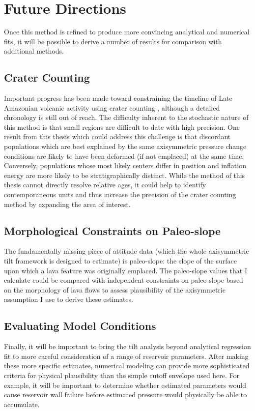 \section{Future Directions}

Once this method is refined to produce more convincing analytical and numerical fits, it will be possible to derive a number of results for comparison with additional methods.

\subsection{Crater Counting}
Important progress has been made toward constraining the timeline of Late Amazonian volcanic activity using crater counting \parencite{kneissl_map-projection-independent_2011,robbins_volcanic_2011,
robbins_large_2013,
platz_crater-based_2013}, although a detailed chronology is still out of reach. The difficulty inherent to the stochastic nature of this method is that small regions are difficult to date with high precision. One result from this thesis which could address this challenge is that discordant populations which are best explained by the same axisymmetric pressure change conditions are likely to have been deformed (if not emplaced) at the same time. Conversely, populations whose most likely centers differ in position and inflation energy are more likely to be stratigraphically distinct. While the method of this thesis cannot directly resolve relative ages, it could help to identify contemporaneous units and thus increase the precision of the crater counting method by expanding the area of interest.

\subsection{Morphological Constraints on Paleo-slope}

The fundamentally missing piece of attitude data (which the whole axisymmetric tilt framework is designed to estimate) is paleo-slope: the slope of the surface upon which a lava feature was originally emplaced. The paleo-slope values that I calculate could be compared with independent constraints on paleo-slope based on the morphology of lava flows \parencite{wadge_lobes_1991, peitersen_correlations_2000, peters_lava_2021} to assess plausibility of the axisymmetric assumption I use to derive these estimates.

\subsection{Evaluating Model Conditions}

Finally, it will be important to bring the tilt analysis beyond analytical regression fit to more careful consideration of a range of reservoir parameters. After making these more specific estimates, numerical modeling can provide more sophisticated criteria for physical plausibility than the simple cutoff envelope used here. For example, it will be important to determine whether estimated parameters would cause reservoir wall failure before estimated pressure would physically be able to accumulate. 